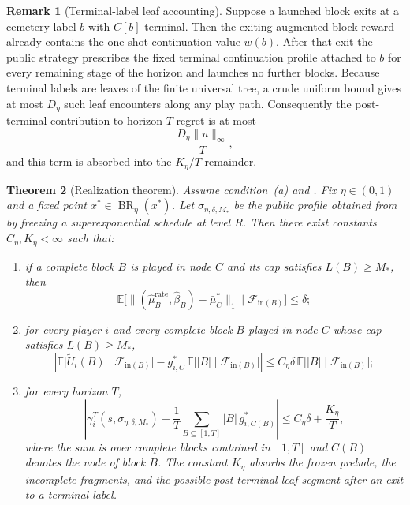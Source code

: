 \documentclass[12pt]{article}
\newtheorem{theorem}{Theorem}[section]
\theoremstyle{definition}
\newtheorem{remark}[theorem]{Remark}
\newcommand{\E}{\mathbb{E}}
\newcommand{\1}{\mathbf{1}}
\newcommand{\cF}{\mathcal{F}}
\DeclareMathOperator{\BR}{BR}
\begin{document}
\begin{remark}[Terminal-label leaf accounting]
\label{rem:terminal-leaf-accounting}
Suppose a launched block exits at a cemetery label $b$ with $C[b]$ terminal.
Then the exiting augmented block reward already contains the one-shot
continuation value $w(b)$. After that exit the public strategy prescribes the
fixed terminal continuation profile attached to $b$ for every remaining stage of
the horizon and launches no further blocks. Because terminal labels are leaves
of the finite universal tree, a crude uniform bound gives at most $D_\eta$ such
leaf encounters along any play path. Consequently the post-terminal
contribution to horizon-$T$ regret is at most
\[
\frac{D_\eta\|u\|_\infty}{T},
\]
and this term is absorbed into the $K_\eta/T$ remainder.
\end{remark}

\begin{theorem}[Realization theorem]
\label{thm:realization}
Assume condition~\textnormal{(a)} and . Fix
$\eta\in(0,1)$ and a fixed point $x^*\in\BR_\eta(x^*)$. Let
$\sigma_{\eta,\delta,M_*}$ be the public profile obtained from
 by freezing a superexponential schedule at level $R$.
Then there exist constants $C_\eta,K_\eta<\infty$ such that:
\begin{enumerate}[label=\textnormal{(Q\arabic*)},leftmargin=2.8em]
\item if a complete block $B$ is played in node $C$ and its cap satisfies
$L(B)\ge M_*$, then
\begin{equation}
\label{eq:block-occupation-realization}
\E\bigl[\|(\widehat\mu_B^{\mathrm{rate}},\widehat\beta_B)-\bar\mu_C^*\|_1
\mid \cF_{\mathrm{in}(B)}\bigr]
\le \delta;
\end{equation}
\item for every player $i$ and every complete block $B$ played in node $C$
whose cap satisfies $L(B)\ge M_*$,
\begin{equation}
\label{eq:block-payoff-realization}
\left|
\E\bigl[\widetilde U_i(B)\mid \cF_{\mathrm{in}(B)}\bigr]
-
g_{i,C}^*\,\E\bigl[|B|\mid \cF_{\mathrm{in}(B)}\bigr]
\right|
\le C_\eta\delta\,\E\bigl[|B|\mid \cF_{\mathrm{in}(B)}\bigr];
\end{equation}
\item for every horizon $T$,
\begin{equation}
\label{eq:realization-tail-bound}
\left|
\gamma_i^T(s,\sigma_{\eta,\delta,M_*})
-
\frac1T\sum_{B\subseteq [1,T]} |B|\,g_{i,C(B)}^*
\right|
\le C_\eta\delta + \frac{K_\eta}{T},
\end{equation}
where the sum is over complete blocks contained in $[1,T]$ and $C(B)$ denotes the
node of block $B$. The constant $K_\eta$ absorbs the frozen prelude, the
incomplete fragments, and the possible post-terminal leaf segment after an exit
to a terminal label.
\end{enumerate}
\end{theorem}
\end{document}
